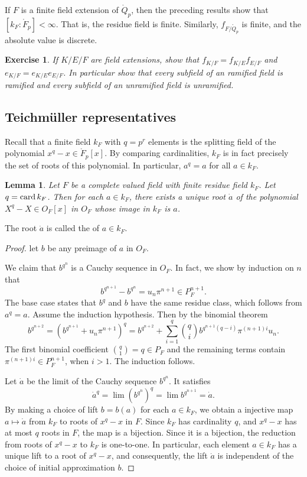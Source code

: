 \documentclass{amsart}
\newtheorem{lemma}[equation]{Lemma}
\newtheorem{exercise}{Exercise}
\begin{document}
If $F$ is a finite field extension of $\ring{Q}_p$, then the preceding results
show that $[k_F:\ring{F}_p]<\infty$.  That is, the residue field is finite.
Similarly, $f_{F/\ring{Q}_p}$ is finite, and the absolute value is discrete.

\begin{exercise}\label{ex:e-m}  If $K/E/F$ are field extensions, show that
$f_{K/F}=f_{K/E}f_{E/F}$ and $e_{K/F}=e_{K/E}e_{E/F}$.  In particular show
that every subfield of an ramified field is ramified and every subfield of
an unramified field is unramified.
\end{exercise}

\subsection{Teichm\"uller representatives}

Recall that a finite field $k_F$ with $q=p^r$ elements is the splitting field of 
the polynomial $x^q-x\in \ring{F}_p[x]$.  By comparing cardinalities, $k_F$ is in fact
precisely the set of roots of this polynomial.  In particular, $a^q=a$ for all
$a\in k_F$.

\begin{lemma}  Let $F$ be a complete valued field with finite residue field $k_F$.
Let $q = {\operatorname{card}}\,k_F$.  Then for each $a\in k_F$, there exists a unique root $\dot a$ of
the polynomial $X^q-X\in O_F[x]$ in $O_F$ whose image in $k_F$ is $a$.
\end{lemma}

The root $\dot a$ is called the  of $a\in k_F$.

\begin{proof} let $b$ be any preimage of $a$ in $O_F$.  

We claim that $b^{q^n}$ is a Cauchy sequence in $O_F$. In fact, we show by induction
on $n$ 
that 
\[
b^{q^{n+1}} - b^{q^n} = u_n\pi^{n+1} \in P_F^{n+1}.
\]
The base case states that $b^q$ and $b$ have the same residue class, which follows from
 $a^q = a$.
Assume the induction hypothesis.
Then by the binomial theorem
\[
b^{q^{n+2}} = (b^{q^{n+1}} + u_n\pi^{n+1})^q 
= b^{q^{n+2}} + {\sum_{i=1}^q {q\choose i}b^{q^{n+1}(q-i)} \pi^{(n+1)i}u_n}.
\]
The first binomial coefficient ${q\choose 1} = q\in P_F$ and the
remaining terms contain $\pi^{(n+1)i}\in P_F^{n+1}$, when $i>1$. The induction
follows.

Let $\dot a$ be the limit of the Cauchy sequence $b^{q^n}$. 
It satisfies
\[
\dot a ^q = \lim (b^{q^n})^q = \lim b^{q^{n+1}} = \dot a.
\]
By making a choice of lift $b=b(a)$ for each $a\in k_F$, we obtain 
 a injective map $a\mapsto \dot a$ from $k_F$ to roots of $x^q-x$ in $F$.  Since
$k_F$ has cardinality $q$, and $x^q-x$ has at most $q$ roots in $F$, 
the map is a bijection.  Since it is a bijection, the reduction from roots of
$x^q-x$ to $k_F$ is one-to-one.  In particular, each element $a\in k_F$ has a unique
lift to a root of $x^q-x$, and consequently, the lift $\dot a$ is
 independent of the choice of initial approximation $b$. 
\end{proof}
\end{document}
